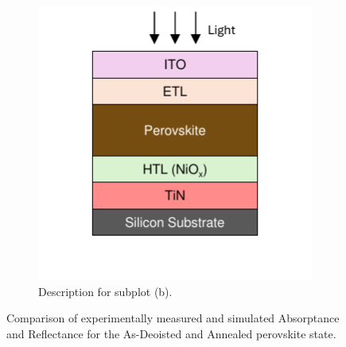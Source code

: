 \begin{figure}[htbp]
\begin{subfigure}[t]{0.49\textwidth}
        \includegraphics[width=\textwidth]{chapters/material_properties/images/PIX_Stack.pdf} %
        \caption{Description for subplot (b).}
        \label{fig:sub-b}
    \end{subfigure}

    \caption{Comparison of experimentally measured and simulated Absorptance and Reflectance for the As-Deoisted and Annealed perovskite state.}
    \label{fig:1x2plot}
\end{figure}


